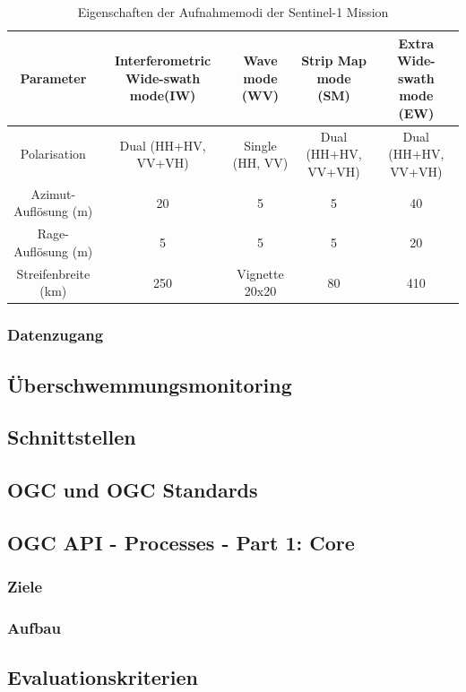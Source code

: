 \begin{table}[H]
    \centering
    \caption{Eigenschaften der Aufnahmemodi der Sentinel-1 Mission \cite{sentinel_1_overview}}
\begin{center}
    \begin{tabular}{|c|c|c|c|c|} 
        Parameter & Interferometric Wide-swath mode(IW) & Wave mode (WV) & Strip Map mode (SM) & Extra Wide-swath mode (EW) \\ 
        \hline
        Polarisation & Dual (HH+HV, VV+VH) & Single (HH, VV) & Dual (HH+HV, VV+VH) & Dual (HH+HV, VV+VH) \\ 
        Azimut-Auflösung (m) & 20 & 5 & 5 & 40 \\
        Rage-Auflösung (m) & 5 & 5 & 5 & 20 \\
        Streifenbreite (km) & 250 & Vignette 20x20 & 80 & 410\\
    \end{tabular}
    \label{table:1}
\end{center}
\end{table}

\subsubsection{Datenzugang}
\subsection{Überschwemmungsmonitoring}
\subsection{Schnittstellen}
\subsection{OGC und OGC Standards}
\subsection{OGC API - Processes - Part 1: Core}
\subsubsection{Ziele}
\subsubsection{Aufbau}
\subsection{Evaluationskriterien}

